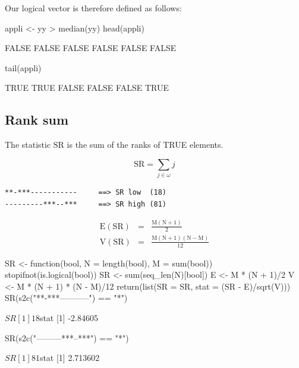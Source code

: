 \documentclass{article}
\begin{document}
Our logical vector is therefore defined as follows:

\begin{Schunk}
\begin{Sinput}
 appli <- yy > median(yy)
 head(appli)
\end{Sinput}
\begin{Soutput}
[1] FALSE FALSE FALSE FALSE FALSE FALSE
\end{Soutput}
\begin{Sinput}
 tail(appli)
\end{Sinput}
\begin{Soutput}
[1]  TRUE  TRUE FALSE FALSE FALSE  TRUE
\end{Soutput}
\end{Schunk}

\subsection{Rank sum}

The statistic $\mathrm{SR}$ is the sum of the ranks of TRUE elements.

$$
\mathrm{SR} = \sum_{j \in \omega}{j}
$$

\begin{verbatim}
**-***-----------     ==> SR low  (18)
---------***--***     ==> SR high (81)
\end{verbatim}

\begin{eqnarray*}
\mathrm{E(SR)} & = & \mathrm{\frac{M(N + 1)}{2}} \\
\mathrm{V(SR)} & = & \mathrm{\frac{M(N + 1)(N - M)}{12}}
\end{eqnarray*}


\begin{Schunk}
\begin{Sinput}
 SR <- function(bool, N = length(bool), M = sum(bool)) {
     stopifnot(is.logical(bool))
     SR <- sum(seq_len(N)[bool])
     E <- M * (N + 1)/2
     V <- M * (N + 1) * (N - M)/12
     return(list(SR = SR, stat = (SR - E)/sqrt(V)))
 }
 SR(s2c("**-***-----------") == "*")
\end{Sinput}
\begin{Soutput}
$SR
[1] 18

$stat
[1] -2.84605
\end{Soutput}
\begin{Sinput}
 SR(s2c("---------***--***") == "*")
\end{Sinput}
\begin{Soutput}
$SR
[1] 81

$stat
[1] 2.713602
\end{Soutput}
\end{Schunk}
\end{document}
